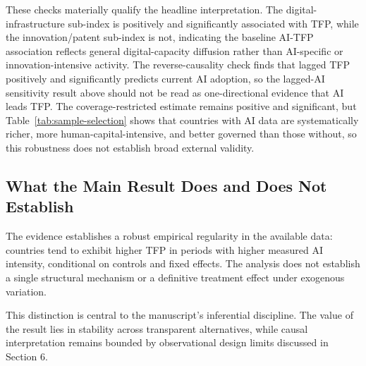 These checks materially qualify the headline interpretation. The digital-infrastructure sub-index is positively and significantly associated with TFP, while the innovation/patent sub-index is not, indicating the baseline AI-TFP association reflects general digital-capacity diffusion rather than AI-specific or innovation-intensive activity. The reverse-causality check finds that lagged TFP positively and significantly predicts current AI adoption, so the lagged-AI sensitivity result above should not be read as one-directional evidence that AI leads TFP. The coverage-restricted estimate remains positive and significant, but Table~\ref{tab:sample-selection} shows that countries with AI data are systematically richer, more human-capital-intensive, and better governed than those without, so this robustness does not establish broad external validity.

\subsection{What the Main Result Does and Does Not Establish}

The evidence establishes a robust empirical regularity in the available data: countries tend to exhibit higher TFP in periods with higher measured AI intensity, conditional on controls and fixed effects. The analysis does not establish a single structural mechanism or a definitive treatment effect under exogenous variation.

This distinction is central to the manuscript's inferential discipline. The value of the result lies in stability across transparent alternatives, while causal interpretation remains bounded by observational design limits discussed in Section 6.
